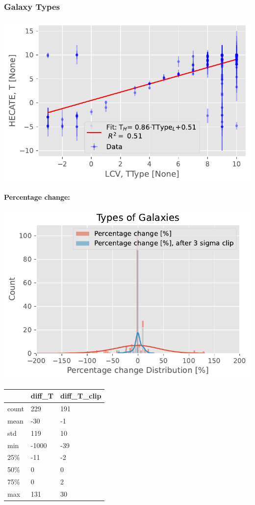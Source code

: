 \documentclass[
]{article}
\begin{document}
\subsubsection{Galaxy Types}

\includegraphics{compare_files/figure-pdf/cell-23-output-1.pdf}

\textbf{Percentage change:}

\includegraphics{compare_files/figure-pdf/cell-24-output-1.pdf}

\begin{longtable}[]{@{}lll@{}}
\toprule\noalign{}
& diff\_T & diff\_T\_clip \\
\midrule\noalign{}
\endhead
\bottomrule\noalign{}
\endlastfoot
count & 229 & 191 \\
mean & -30 & -1 \\
std & 119 & 10 \\
min & -1000 & -39 \\
25\% & -11 & -2 \\
50\% & 0 & 0 \\
75\% & 0 & 2 \\
max & 131 & 30 \\
\end{longtable}
\end{document}
